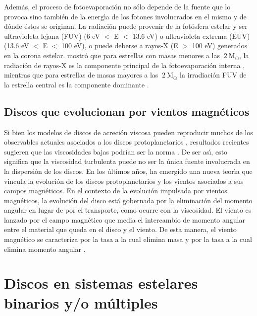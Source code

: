 \documentclass[baaa]{baaa}
\begin{document}
Adem\'as, el proceso de fotoevaporaci\'on no s\'olo depende de la fuente que lo provoca sino tambi\'en de la energ\'{\i}a de los fotones involucrados en el mismo \citep{Hollenbach1994} y de d\'onde \'estos se originan. La radiación puede provenir de la fot\'osfera estelar y ser ultravioleta lejana (FUV) (6 eV $<$ E $<$ 13.6 eV) o ultravioleta extrema (EUV) (13.6 eV $<$ E $<$ 100 eV), o puede deberse a rayos-X (E $>$ 100 eV) generados en la corona  estelar. \citet{Kunitomo2021} mostr\'o que para estrellas con masas menores a las $~2~\text{M}_{\odot}$, la radiaci\'on de rayos-X es la componente principal de la fotoevaporaci\'on interna \citep[ej.][]{Owen2012, Picogna2019}, mientras que para estrellas de masas mayores a las $~2~\text{M}_{\odot}$ la irradiaci\'on FUV de la estrella central es la componente dominante \citep[ej.][]{Gorti2009, Kunitomo2021}.

 \subsection{Discos que evolucionan por vientos magn\'eticos}

Si bien los modelos de discos de acreci\'on viscosa pueden reproducir muchos de los observables actuales asociados a los discos protoplanetarios \citep[ver][]{Manara2023}, resultados recientes sugieren que las viscosidades bajas podrían ser la norma \citep[ver][y las referencias all\'{\i} mencionadas]{Rosotti2023}. De ser as\'{\i}, esto significa que la viscosidad turbulenta puede no ser la \'unica fuente involucrada en la dispersi\'on de los discos. En los últimos a\~nos, ha emergido una nueva teor\'{\i}a que vincula la evoluci\'on de los discos protoplanetarios y los vientos asociados a sus campos magn\'eticos. En el contexto de la evolución impulsada por vientos magn\'eticos, la evoluci\'on del disco est\'a gobernada por la eliminaci\'on del momento angular en lugar de por el transporte, como ocurre con la viscosidad. El viento es lanzado por el campo magn\'etico que media el intercambio de momento angular entre el material que queda en el disco y el viento. De esta manera, el viento magn\'etico se caracteriza por la tasa a la cual elimina masa y por la tasa a la cual elimina momento angular \citep{Suziki2016}. 

\section{Discos en sistemas estelares binarios y/o m\'ultiples}
\end{document}
